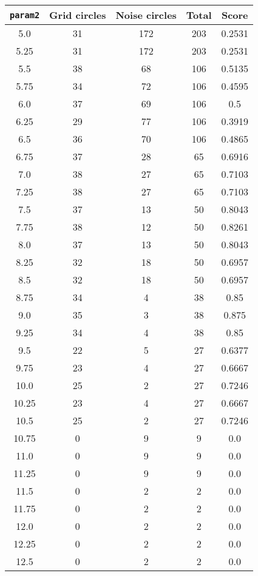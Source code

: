 \documentclass[letterpaper, 12pt]{article}
\begin{document}
\begin{longtable}{|c|c|c|c|c|}
\hline
\textbf{\texttt{param2}} & \textbf{Grid circles} & \textbf{Noise circles} & \textbf{Total} & \textbf{Score} \\
\hline
5.0 & 31 & 172 & 203 & 0.2531 \\
\hline
5.25 & 31 & 172 & 203 & 0.2531 \\
\hline
5.5 & 38 & 68 & 106 & 0.5135 \\
\hline
5.75 & 34 & 72 & 106 & 0.4595 \\
\hline
6.0 & 37 & 69 & 106 & 0.5 \\
\hline
6.25 & 29 & 77 & 106 & 0.3919 \\
\hline
6.5 & 36 & 70 & 106 & 0.4865 \\
\hline
6.75 & 37 & 28 & 65 & 0.6916 \\
\hline
7.0 & 38 & 27 & 65 & 0.7103 \\
\hline
7.25 & 38 & 27 & 65 & 0.7103 \\
\hline
7.5 & 37 & 13 & 50 & 0.8043 \\
\hline
7.75 & 38 & 12 & 50 & 0.8261 \\
\hline
8.0 & 37 & 13 & 50 & 0.8043 \\
\hline
8.25 & 32 & 18 & 50 & 0.6957 \\
\hline
8.5 & 32 & 18 & 50 & 0.6957 \\
\hline
8.75 & 34 & 4 & 38 & 0.85 \\
\hline
9.0 & 35 & 3 & 38 & 0.875 \\
\hline
9.25 & 34 & 4 & 38 & 0.85 \\
\hline
9.5 & 22 & 5 & 27 & 0.6377 \\
\hline
9.75 & 23 & 4 & 27 & 0.6667 \\
\hline
10.0 & 25 & 2 & 27 & 0.7246 \\
\hline
10.25 & 23 & 4 & 27 & 0.6667 \\
\hline
10.5 & 25 & 2 & 27 & 0.7246 \\
\hline
10.75 & 0 & 9 & 9 & 0.0 \\
\hline
11.0 & 0 & 9 & 9 & 0.0 \\
\hline
11.25 & 0 & 9 & 9 & 0.0 \\
\hline
11.5 & 0 & 2 & 2 & 0.0 \\
\hline
11.75 & 0 & 2 & 2 & 0.0 \\
\hline
12.0 & 0 & 2 & 2 & 0.0 \\
\hline
12.25 & 0 & 2 & 2 & 0.0 \\
\hline
12.5 & 0 & 2 & 2 & 0.0 \\

\end{longtable}
\end{document}

